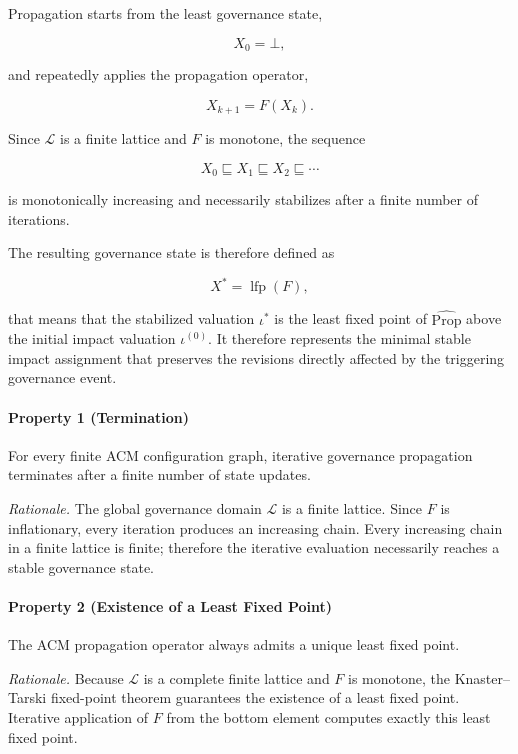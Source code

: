 \documentclass[10pt]{article}
\begin{document}
Propagation starts from the least governance state,

\[
X_0=\bot,
\]

and repeatedly applies the propagation operator,

\[
X_{k+1}
=
F(X_k).
\]

Since $\mathcal{L}$ is a finite lattice and $F$ is monotone, the sequence

\[
X_0
\sqsubseteq
X_1
\sqsubseteq
X_2
\sqsubseteq
\cdots
\]

is monotonically increasing and necessarily stabilizes after a finite number
of iterations.

The resulting governance state is therefore defined as

\[
X^\ast
=
\operatorname{lfp}(F),
\]

that means that the stabilized valuation $\iota^{*}$ is the least fixed point of
$\widehat{\mathrm{Prop}}$ above the initial impact valuation
$\iota^{(0)}$. It therefore represents the minimal stable impact assignment
that preserves the revisions directly affected by the triggering governance
event.


\paragraph{Property 1 (Termination)}

For every finite ACM configuration graph, iterative governance propagation
terminates after a finite number of state updates.

\emph{Rationale.}
The global governance domain $\mathcal{L}$ is a finite lattice.
Since $F$ is inflationary, every iteration produces an increasing chain.
Every increasing chain in a finite lattice is finite; therefore the iterative
evaluation necessarily reaches a stable governance state.


\paragraph{Property 2 (Existence of a Least Fixed Point)}

The ACM propagation operator always admits a unique least fixed point.

\emph{Rationale.}
Because $\mathcal{L}$ is a complete finite lattice and $F$ is monotone, the
Knaster--Tarski fixed-point theorem guarantees the existence of a least fixed
point. Iterative application of $F$ from the bottom element computes exactly
this least fixed point.
\end{document}
